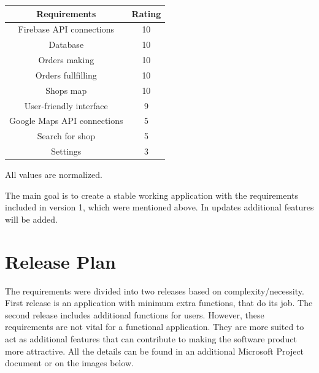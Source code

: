 \documentclass{scrreprt}
\begin{document}
\begin{tabular}{| c | c |} \hline
\textbf {Requirements} & \textbf{Rating} \\ \hline
Firebase API connections & 10\\ \hline
Database & 10\\ \hline
Orders making & 10\\ \hline
Orders fullfilling & 10\\ \hline
Shops map & 10\\ \hline
User-friendly interface & 9\\ \hline
Google Maps API connections & 5\\ \hline
Search for shop & 5\\ \hline
Settings & 3\\ \hline
\end{tabular}

All values are normalized. 

The main goal is to create a stable working application with the requirements included in version 1, which were mentioned above. In updates additional features will be added. 

\section{Release Plan}
The requirements were divided into two releases based on complexity/necessity. First release is an application with minimum extra functions, that do its job. The second release includes additional functions for users. However, these requirements are not vital for a functional application. They are more suited to act as additional features that can contribute to making the software product more attractive. All the details can be found in an additional Microsoft Project document or on the images below.

\begin{figure}[h]
\end{figure}
‎
\end{document}
